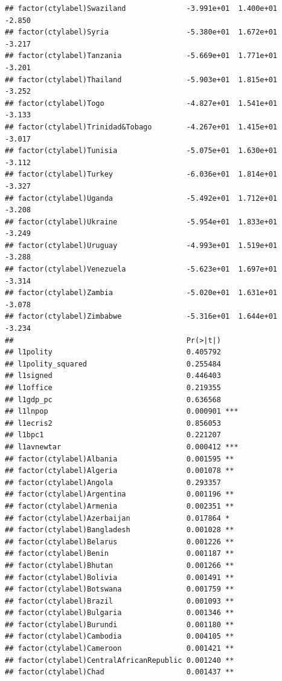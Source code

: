 \documentclass[12pt]{article}\usepackage[]{graphicx}\usepackage[]{color}
\makeatletter
\newenvironment{kframe}{%
 \def\at@end@of@kframe{}%
 \ifinner\ifhmode%
  \def\at@end@of@kframe{\end{minipage}}%
  \begin{minipage}{\columnwidth}%
 \fi\fi%
 \def\FrameCommand##1{\hskip\@totalleftmargin \hskip-\fboxsep
 \colorbox{shadecolor}{##1}\hskip-\fboxsep
     \hskip-\linewidth \hskip-\@totalleftmargin \hskip\columnwidth}%
 \MakeFramed {\advance\hsize-\width
   \@totalleftmargin\z@ \linewidth\hsize
   \@setminipage}}%
 {\par\unskip\endMakeFramed%
 \at@end@of@kframe}
\newenvironment{knitrout}{}{} %
\makeatother
\begin{document}
\begin{knitrout}
\begin{kframe}
\begin{verbatim}
## factor(ctylabel)Swaziland              -3.991e+01  1.400e+01  -2.850
## factor(ctylabel)Syria                  -5.380e+01  1.672e+01  -3.217
## factor(ctylabel)Tanzania               -5.669e+01  1.771e+01  -3.201
## factor(ctylabel)Thailand               -5.903e+01  1.815e+01  -3.252
## factor(ctylabel)Togo                   -4.827e+01  1.541e+01  -3.133
## factor(ctylabel)Trinidad&Tobago        -4.267e+01  1.415e+01  -3.017
## factor(ctylabel)Tunisia                -5.075e+01  1.630e+01  -3.112
## factor(ctylabel)Turkey                 -6.036e+01  1.814e+01  -3.327
## factor(ctylabel)Uganda                 -5.492e+01  1.712e+01  -3.208
## factor(ctylabel)Ukraine                -5.954e+01  1.833e+01  -3.249
## factor(ctylabel)Uruguay                -4.993e+01  1.519e+01  -3.288
## factor(ctylabel)Venezuela              -5.623e+01  1.697e+01  -3.314
## factor(ctylabel)Zambia                 -5.020e+01  1.631e+01  -3.078
## factor(ctylabel)Zimbabwe               -5.316e+01  1.644e+01  -3.234
##                                        Pr(>|t|)    
## l1polity                               0.405792    
## l1polity_squared                       0.255484    
## l1signed                               0.446403    
## l1office                               0.219355    
## l1gdp_pc                               0.636568    
## l1lnpop                                0.000901 ***
## l1ecris2                               0.856053    
## l1bpc1                                 0.221207    
## l1avnewtar                             0.000412 ***
## factor(ctylabel)Albania                0.001595 ** 
## factor(ctylabel)Algeria                0.001078 ** 
## factor(ctylabel)Angola                 0.293357    
## factor(ctylabel)Argentina              0.001196 ** 
## factor(ctylabel)Armenia                0.002351 ** 
## factor(ctylabel)Azerbaijan             0.017864 *  
## factor(ctylabel)Bangladesh             0.001028 ** 
## factor(ctylabel)Belarus                0.001226 ** 
## factor(ctylabel)Benin                  0.001187 ** 
## factor(ctylabel)Bhutan                 0.001266 ** 
## factor(ctylabel)Bolivia                0.001491 ** 
## factor(ctylabel)Botswana               0.001759 ** 
## factor(ctylabel)Brazil                 0.001093 ** 
## factor(ctylabel)Bulgaria               0.001346 ** 
## factor(ctylabel)Burundi                0.001180 ** 
## factor(ctylabel)Cambodia               0.004105 ** 
## factor(ctylabel)Cameroon               0.001421 ** 
## factor(ctylabel)CentralAfricanRepublic 0.001240 ** 
## factor(ctylabel)Chad                   0.001437 ** 

\end{verbatim}
\end{kframe}
\end{knitrout}
\end{document}
